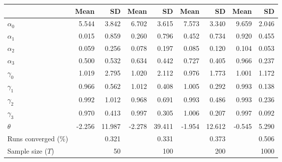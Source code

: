 
\begin{tabular}[t]{lrrrrrrrr}
\toprule
  & Mean & SD & Mean  & SD  & Mean   & SD   & Mean    & SD   \\
\midrule
$\alpha_{0}$ & 5.544 & 3.842 & 6.702 & 3.615 & 7.573 & 3.340 & 9.659 & 2.046\\
$\alpha_{1}$ & 0.015 & 0.859 & 0.260 & 0.796 & 0.452 & 0.734 & 0.920 & 0.455\\
$\alpha_{2}$ & 0.059 & 0.256 & 0.078 & 0.197 & 0.085 & 0.120 & 0.104 & 0.053\\
$\alpha_{3}$ & 0.500 & 0.532 & 0.634 & 0.442 & 0.727 & 0.405 & 0.966 & 0.237\\
$\gamma_{0}$ & 1.019 & 2.795 & 1.020 & 2.112 & 0.976 & 1.773 & 1.001 & 1.172\\
$\gamma_{1}$ & 0.966 & 0.562 & 1.012 & 0.408 & 1.005 & 0.292 & 0.993 & 0.138\\
$\gamma_{2}$ & 0.992 & 1.012 & 0.968 & 0.691 & 0.993 & 0.486 & 0.993 & 0.236\\
$\gamma_{3}$ & 0.970 & 0.413 & 0.997 & 0.305 & 1.006 & 0.207 & 0.997 & 0.092\\
$\theta$ & -2.256 & 11.987 & -2.278 & 39.411 & -1.954 & 12.612 & -0.545 & 5.290\\
Runs converged (\%) &  & 0.321 &  & 0.331 &  & 0.373 &  & 0.506\\
Sample size ($T$) &  & 50 &  & 100 &  & 200 &  & 1000\\
\bottomrule
\end{tabular}
